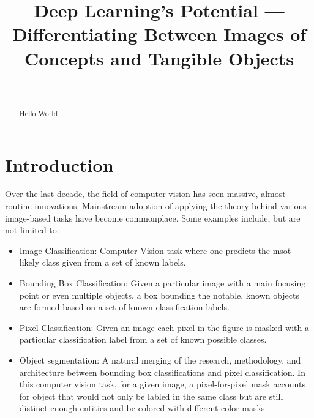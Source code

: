 \documentclass[conference]{IEEEtran}
\title{Deep Learning’s Potential --- Differentiating Between Images of Concepts
and Tangible Objects}
\author{%
    \IEEEauthorblockN{Pratik Bhusal}
    \IEEEauthorblockA{%
        pratik.bhusal@utdallas.edu\\
        \today
    }\\

    \IEEEauthorblockN{Max Xie}
    \IEEEauthorblockA{%
        max.xie@utdallas.edu\\
        \today
    }
}
\begin{document}
\maketitle



\begin{abstract} %


Hello World
\end{abstract} %



\section{Introduction} %

Over the last decade, the field of computer vision has seen massive, almost
routine innovations. Mainstream adoption of applying the theory behind various
image-based tasks have become commonplace. Some examples include, but are not
limited to:

\begin{itemize}
    \item Image Classification: Computer Vision task where one predicts the
        msot likely class given from a set of known labels.
    \item Bounding Box Classification: Given a particular image with a main
        focusing point or even multiple objects, a box bounding the notable,
        known objects are formed based on a set of known classification labels.
    \item Pixel Classification: Given an image each pixel in the figure is
        masked with a particular classification label from a set of known
        possible classes.
    \item Object segmentation: A natural merging of the research, methodology,
        and architecture between bounding box classifications and pixel
        classification. In this computer vision task, for a given image, a
        pixel-for-pixel mask accounts for object that would not only be labled
        in the same class but are still distinct enough entities and be colored
        with different color masks
\end{itemize}
\end{document}
